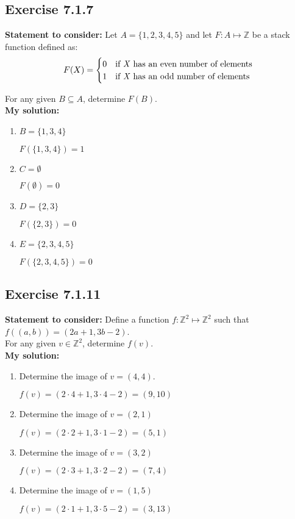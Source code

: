 \documentclass{report}
\newcommand{\cent}[1]{\begin{center}#1\end{center}}
\newcommand{\doubleZ}{\mathbb{Z}}
\newcommand{\In}{\! \in \!}
\newcommand{\assignmentDescription}{\textbf{Statement to consider: }}
\newcommand{\solution}{\textbf{My solution: }}
\newcommand{\Exercise}[1]{\subsection{Exercise #1}}
\newcommand{\defaultEnumerateLabel}{\textbf{\alph*.}}
\begin{document}
 \Exercise{7.1.7}
 
 \assignmentDescription
 Let $A=\{1,2,3,4,5\}$ and let $F : A \mapsto \doubleZ$ be a stack function defined as:
 \[ F(X) = 
 \begin{cases}
 	0 &  \text{if \textit{X} has an even number of elements} \\
 	1 &  \text{if \textit{X} has an odd number of elements}
 \end{cases} 
 	\]
 	
 	For any given $B \subseteq A$, determine $F(B)$.\\
 	
 	\solution
 	\begin{enumerate}[label=\defaultEnumerateLabel]
 		\item $B= \{1,3,4\}$
 		
 		\cent{$F(\{1,3,4\}) = 1$}
 		
 		\item $C = \emptyset$
 		
 		\cent{$F(\emptyset) = 0$}
 		
 		\item $D = \{2,3\}$
 		
 		\cent{$ F(\{2,3\}) = 0 $}
 		
 		\item $E = \{2,3,4,5\}$
 		
 		\cent{$ F(\{2,3,4,5\}) = 0 $}
 	\end{enumerate}
 
 	\Exercise{7.1.11}
 	
 	\assignmentDescription
 	Define a function $f : \doubleZ^2 \mapsto \doubleZ^2$ such that $f((a,b)) = (2a+1,3b-2)$. \\
 	
 	For any given $v \In \doubleZ^2$, determine $f(v)$.\\
 	
 	\solution
 	\begin{enumerate}[label=\defaultEnumerateLabel]
 		\item Determine the image of  $v = (4,4)$.
 		
 		\cent{$f(v) = (2\cdot 4 + 1,3 \cdot 4 - 2) = (9,10)$}
 		
 		\item Determine the image of $v = (2,1)$
 		
 		\cent{$f(v) = (2\cdot 2 + 1,3 \cdot 1 - 2) = (5,1)$}
 		
 		\item Determine the image of $v = (3,2)$
 		
 		\cent{$f(v) = (2\cdot 3 + 1,3 \cdot 2 - 2) = (7,4)$}
 		
 		\item Determine the image of $v=(1,5)$
 		
 		\cent{$f(v) = (2\cdot 1 + 1,3 \cdot 5 - 2) = (3,13)$}
 		
 	\end{enumerate}
 
\end{document}
